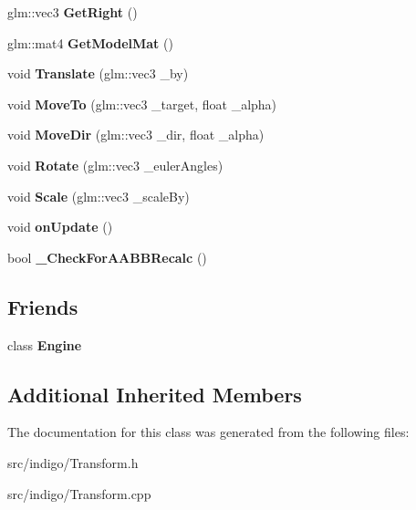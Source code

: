 \begin{DoxyCompactItemize}
glm\+::vec3 {\bfseries Get\+Right} ()
\item 
\mbox{\label{class_indigo_1_1_transform_ad4d433d8ecad0eb730be4294c57938db}} 
glm\+::mat4 {\bfseries Get\+Model\+Mat} ()
\item 
\mbox{\label{class_indigo_1_1_transform_a2b3b2d50122bf966469832d5fc361834}} 
void {\bfseries Translate} (glm\+::vec3 \+\_\+by)
\item 
\mbox{\label{class_indigo_1_1_transform_a78633ea6630bd3ce493529ff122354e6}} 
void {\bfseries Move\+To} (glm\+::vec3 \+\_\+target, float \+\_\+alpha)
\item 
\mbox{\label{class_indigo_1_1_transform_a0d837c0a1d80c8e249e854c584b4b728}} 
void {\bfseries Move\+Dir} (glm\+::vec3 \+\_\+dir, float \+\_\+alpha)
\item 
\mbox{\label{class_indigo_1_1_transform_a41b24ff268187636f66dfa65432bda3a}} 
void {\bfseries Rotate} (glm\+::vec3 \+\_\+euler\+Angles)
\item 
\mbox{\label{class_indigo_1_1_transform_abb94f1c5b70ed256da1629130d680dee}} 
void {\bfseries Scale} (glm\+::vec3 \+\_\+scale\+By)
\item 
\mbox{\label{class_indigo_1_1_transform_a52ef75756c510944b8257d39a70d39ef}} 
void {\bfseries on\+Update} ()
\item 
\mbox{\label{class_indigo_1_1_transform_ae62954b4df267cc4c7a1a837e1f9e5c0}} 
bool {\bfseries \+\_\+\+Check\+For\+A\+A\+B\+B\+Recalc} ()
\end{DoxyCompactItemize}
\subsection*{Friends}
\begin{DoxyCompactItemize}
\item 
\mbox{\label{class_indigo_1_1_transform_a3e1914489e4bed4f9f23cdeab34a43dc}} 
class {\bfseries Engine}
\end{DoxyCompactItemize}
\subsection*{Additional Inherited Members}


The documentation for this class was generated from the following files\+:\begin{DoxyCompactItemize}
\item 
src/indigo/Transform.\+h\item 
src/indigo/Transform.\+cpp\end{DoxyCompactItemize}
